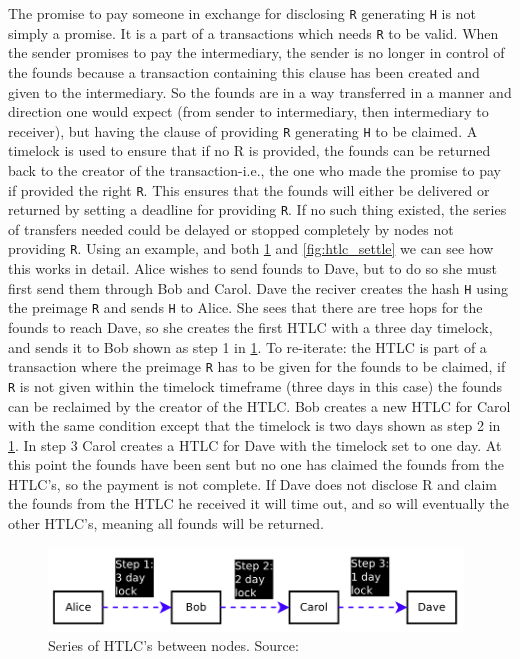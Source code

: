 The promise to pay someone in exchange for disclosing {\tt R} generating {\tt H} is not simply a promise. It is a part of a transactions which needs {\tt R} to be valid. When the sender promises to pay the intermediary, the sender is no longer in control of the founds because a transaction containing this clause has been created and given to the intermediary. So the founds are in a way transferred in a manner and direction one would expect (from sender to intermediary, then intermediary to receiver), but having the clause of providing {\tt R} generating {\tt H} to be claimed. A timelock is used to ensure that if no R is provided, the founds can be returned back to the creator of the transaction-i.e., the one who made the promise to pay if provided the right {\tt R}. This ensures that the founds will either be delivered or returned by setting a deadline for providing {\tt R}. If no such thing existed, the series of transfers needed could be delayed or stopped completely by nodes not providing {\tt R}.
Using an example, and both \cref{fig:htlc_promise} and \cref{fig:htlc_settle} we can see how this works in detail.
Alice wishes to send founds to Dave, but to do so she must first send them through Bob and Carol. Dave the reciver creates the hash {\tt H} using the preimage {\tt R} and sends {\tt H} to Alice. She sees that there are tree hops for the founds to reach Dave, so she creates the first HTLC with a three day timelock, and sends it to Bob shown as step 1 in \cref{fig:htlc_promise}. To re-iterate: the HTLC is part of a transaction where the preimage {\tt R} has to be given for the founds to be claimed, if {\tt R} is not given within the timelock timeframe (three days in this case) the founds can be reclaimed by the creator of the HTLC. Bob creates a new HTLC for Carol with the same condition except that the timelock is two days shown as step 2 in \cref{fig:htlc_promise}. In step 3 Carol creates a HTLC for Dave with the timelock set to one day. At this point the founds have been sent but no one has claimed the founds from the HTLC's, so the payment is not complete. If Dave does not disclose R and claim the founds from the HTLC he received it will time out, and so will eventually the other HTLC's, meaning all founds will be returned.
\\

\begin{figure}[ht]
    \centering
    \includegraphics[width=11cm]{figures/htlc_promise.png}
    \caption{Series of HTLC's between nodes. Source:~\cite{poon2015bitcoin}}
    \label{fig:htlc_promise}
\end{figure}

